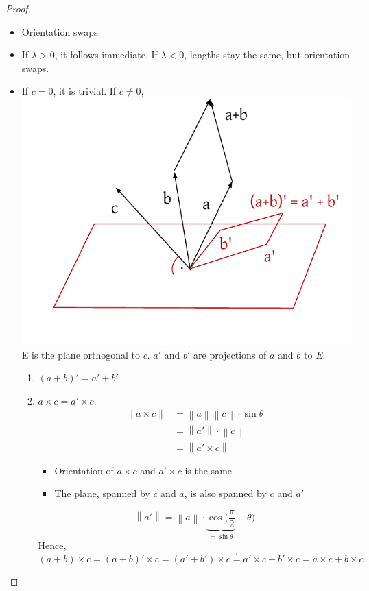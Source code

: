 \documentclass{article}
\newcommand{\norm}[1]{\left\|#1\right\|}
\begin{document}
\begin{proof}
  \begin{itemize}
    \item Orientation swaps.
    \item If $\lambda > 0$, it follows immediate.
      If $\lambda < 0$, lengths stay the same, but orientation swaps.
    \item If $c = 0$, it is trivial. If $c \neq 0$,
      \includegraphics{img/04_apbmc_eq_amcpbmc.pdf}
      E is the plane orthogonal to $c$. $a'$ and $b'$ are projections of $a$ and $b$ to $E$.

      \begin{enumerate}
        \item $(a+b)' = a' + b'$
        \item $a \times c = a' \times c$.
          \begin{align*}
            \norm{a \times c} &= \norm a \norm c \cdot \sin\theta \\
              &= \norm{a'} \cdot \norm{c} \\
              &= \norm{a' \times c}
          \end{align*}
          \begin{itemize}
            \item Orientation of $a \times c$ and $a' \times c$ is the same
            \item The plane, spanned by $c$ and $a$, is also spanned by $c$ and $a'$
          \end{itemize}

          \[ \norm{a'} = \norm{a} \cdot \underbrace{\cos(\frac\pi2}_{=\sin\theta} - \theta) \]
          Hence,
          \[ (a + b) \times c = (a + b)' \times c = (a' + b') \times c \stackrel!= a' \times c + b' \times c = a \times c + b \times c \]


\end{enumerate}
\end{itemize}
\end{proof}
\end{document}
